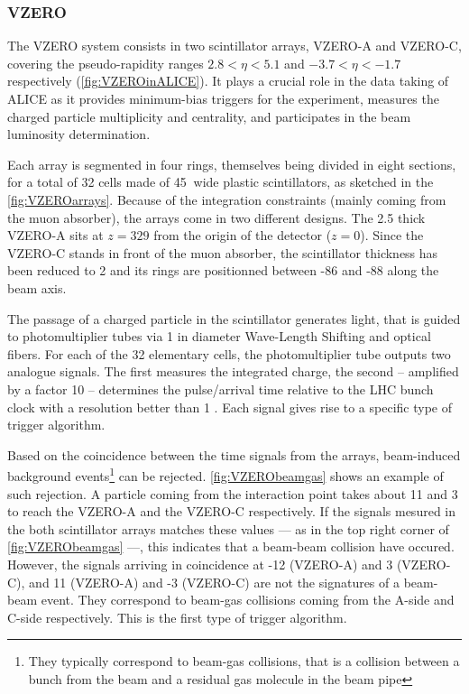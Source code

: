 \subsubsection{VZERO}
\label{subsubsec:VZERO}

The VZERO system consists in two scintillator arrays, VZERO-A and VZERO-C, covering the pseudo-rapidity ranges $2.8 < \eta < 5.1$ and $-3.7 < \eta < -1.7$ respectively (\fig\ref{fig:VZEROinALICE}). It plays a crucial role in the data taking of ALICE as it provides minimum-bias triggers for the experiment, measures the charged particle multiplicity and centrality, and participates in the beam luminosity determination.


Each array is segmented in four rings, themselves being divided in eight sections, for a total of 32 cells made of 45\textdegree$\ $ wide plastic scintillators, as sketched in the \fig\ref{fig:VZEROarrays}. Because of the integration constraints (mainly coming from the muon absorber), the arrays come in two different designs. The 2.5 \cm thick VZERO-A sits at $z = 329$ \cm from the origin of the detector ($z = 0$). Since the VZERO-C stands in front of the muon absorber, the scintillator thickness has been reduced to 2 \cm and its rings are positionned between -86 and -88 \cm along the beam axis. 

The passage of a charged particle in the scintillator generates light, that is guided to photomultiplier tubes via 1 \mm in diameter Wave-Length Shifting and optical fibers. For each of the 32 elementary cells, the photomultiplier tube outputs two analogue signals. The first measures the integrated charge, the second -- amplified by a factor 10 -- determines the pulse/arrival time relative to the LHC bunch clock with a resolution better than 1 \nsec. Each signal gives rise to a specific type of trigger algorithm. 

Based on the coincidence between the time signals from the arrays, beam-induced background events\footnote{They typically correspond to beam-gas collisions, that is a collision between a bunch from the beam and a residual gas molecule in the beam pipe} can be rejected. \Fig\ref{fig:VZERObeamgas} shows an example of such rejection. A particle coming from the interaction point takes about 11 \nsec and 3 \nsec to reach the VZERO-A and the VZERO-C respectively. If the signals mesured in the both scintillator arrays matches these values --- as in the top right corner of \fig\ref{fig:VZERObeamgas} ---, this indicates that a beam-beam collision have occured. However, the signals arriving in coincidence at -12 \nsec (VZERO-A) and 3 \nsec (VZERO-C), and 11 \nsec (VZERO-A) and -3 \nsec (VZERO-C) are not the signatures of a beam-beam event. They correspond to beam-gas collisions coming from the A-side and C-side respectively. This is the first type of trigger algorithm.

